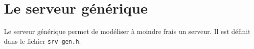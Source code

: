 %
\section{Le serveur générique}
\label{section:srv_gen}

   Le serveur générique permet de modéliser à moindre frais un
serveur. Il est définit dans le fichier {\tt srv-gen.h}.
